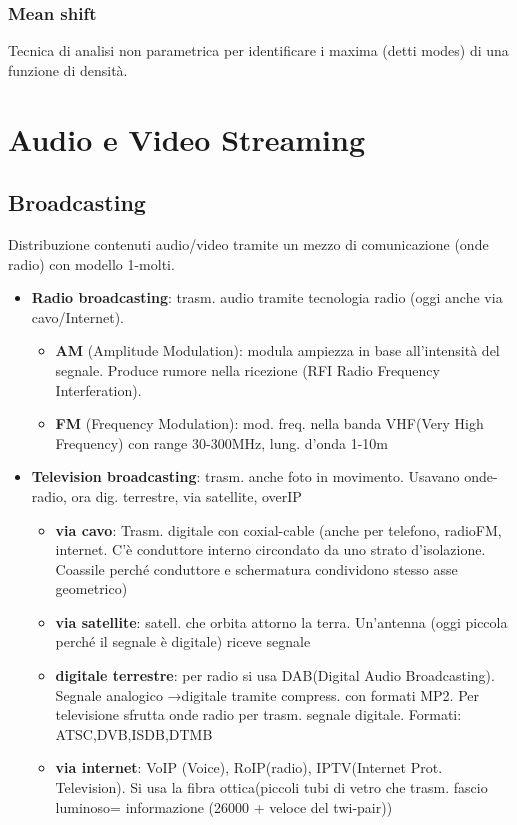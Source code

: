 \documentclass[8pt,a4paper]{article}
\begin{document}
\begin{multicols}{5}
    \subsubsection{Mean shift}
    Tecnica di analisi non parametrica per identificare i maxima (detti modes) di 
    una funzione di densità.

    \section{Audio e Video Streaming}
    \subsection{Broadcasting}
    Distribuzione contenuti audio/video tramite un mezzo di comunicazione (onde radio) con modello 1-molti.
    \begin{itemize}
      \item \textbf{Radio broadcasting}: trasm. audio tramite tecnologia radio (oggi anche via cavo/Internet). 
      \begin{itemize}
        \item \textbf{AM} (Amplitude Modulation): modula ampiezza in base all’intensità del segnale. Produce rumore nella ricezione (RFI Radio Frequency Interferation).
        \item \textbf{FM} (Frequency Modulation): mod. freq. nella banda VHF(Very High Frequency) con range 30-300MHz, lung. d’onda 1-10m
      \end{itemize}
      \item \textbf{Television broadcasting}: trasm. anche foto in movimento. Usavano onde-radio, ora dig. terrestre, via satellite, overIP
      \begin{itemize}
        \item \textbf{via cavo}: Trasm. digitale con coxial-cable (anche per telefono, radioFM, internet. C’è conduttore interno circondato da uno strato d’isolazione. Coassile perché conduttore e schermatura condividono stesso asse geometrico)
        \item \textbf{via satellite}: satell. che orbita attorno la terra. Un’antenna (oggi piccola perché il segnale è digitale) riceve segnale
        \item \textbf{digitale terrestre}: per radio si usa DAB(Digital Audio Broadcasting). Segnale analogico →digitale tramite compress. con formati MP2. Per televisione sfrutta onde radio per trasm. segnale digitale. Formati: ATSC,DVB,ISDB,DTMB
        \item \textbf{via internet}: VoIP (Voice), RoIP(radio), IPTV(Internet Prot. Television). Si usa la fibra ottica(piccoli tubi di vetro che trasm. fascio luminoso= informazione (26000 + veloce del twi-pair))

\end{itemize}
\end{itemize}
\end{multicols}
\end{document}

